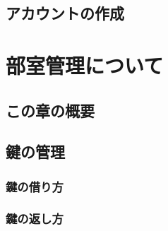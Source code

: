 \documentclass[lualatex,ja=standard,12pt,a4j]{bxjsbook}
\begin{document}
		\section{アカウントの作成}
	\chapter{部室管理について}
		\section{この章の概要}
		\section{鍵の管理}
		\subsection{鍵の借り方}
		\subsection{鍵の返し方}
\end{document}
